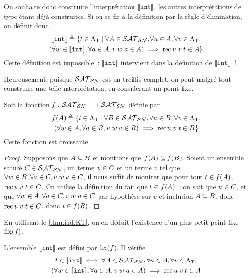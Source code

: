 On souhaite donc construire l'interprétation $\llbracket{\normalfont\texttt{int}}\rrbracket$, les autres
interprétations de type étant déjà construites. Si on se fie à la définition par
la règle d'élimination, on définit donc
\begin{multline*}
  \llbracket{\normalfont\texttt{int}}\rrbracket \triangleq \{t \in \Lambda_{\mathrm{T}} \mid \forall A \in \mathcal{SAT}_{\mathcal{SN}},
  \forall u \in A, \forall v \in \Lambda_{\mathrm{T}},\\
  (\forall w \in \llbracket{\normalfont\texttt{int}}\rrbracket, \forall a \in A, v\;w\;a \in A)
  \implies \operatorname{rec} u\;v\;t \in A\}
\end{multline*}
Cette définition est impossible~: $\llbracket{\normalfont\texttt{int}}\rrbracket$ intervient dans la définition
de $\llbracket{\normalfont\texttt{int}}\rrbracket$~!

Heureusement, puisque $\mathcal{SAT}_{\mathcal{SN}}$ est un treillis complet, on peut malgré tout
construire une telle interprétation, en considérant un point fixe.

\begin{proposition}
  Soit la fonction $f : \displaystyle \mathcal{SAT}_{\mathcal{SN}} \longrightarrow \mathcal{SAT}_{\mathcal{SN}}$ définie par
  \begin{multline*}
    f(A) \triangleq \{t \in \Lambda_{\mathrm{T}} \mid \forall B \in \mathcal{SAT}_{\mathcal{SN}},
    \forall u \in B, \forall v \in \Lambda_{\mathrm{T}},\\
    (\forall w \in A, \forall a \in B, v\;w\;a \in
    B)\implies
    \operatorname{rec} u\;v\;t \in B\}
  \end{multline*}
  Cette fonction est croissante.
\end{proposition}

\begin{proof}
  Supposons que $A \subseteq B$ et montrons que
  $f(A)\subseteq f(B)$.
  Soient un ensemble saturé $C \in \mathcal{SAT}_{\mathcal{SN}}$, un terme $u \in C$
  et un terme $v$ tel que
  $\forall w \in B, \forall a \in C, v\;w\;a \in C$,
  il nous suffit de montrer que pour tout $t \in f(A)$,
  $\operatorname{rec} u\;v\;t \in C$.
  On utilise la définition du fait que $t \in f(A)$~: on sait que
  $u \in C$, et que
  $\forall w \in A, \forall a \in C, v\;w\;a \in C$ par
  hypothèse sur $v$ et inclusion $A \subseteq B$, donc
  $\operatorname{rec} u\;v\;t \in C$, donc $t \in f(B)$.
\end{proof}

En utilisant le \cref{thm.ind.KT}, on en déduit l'existence d'un plus petit
point fixe $\operatorname{fix}(f)$.

\begin{definition}
  L'ensemble $\llbracket{\normalfont\texttt{int}}\rrbracket$ est défini par $\operatorname{fix}(f)$. Il vérifie
  \begin{multline*}
    t \in \llbracket{\normalfont\texttt{int}}\rrbracket \iff \forall A \in \mathcal{SAT}_{\mathcal{SN}},
    \forall u \in A, \forall v \in \Lambda_{\mathrm{T}},\\
    (\forall w \in \llbracket{\normalfont\texttt{int}}\rrbracket, \forall a \in A,
    v\;w\;a \in A)\implies
    \operatorname{rec} u\;v\;t \in A
  \end{multline*}
\end{definition}

